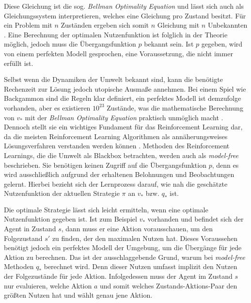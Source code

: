 Diese Gleichung ist die sog. \textit{Bellman Optimality Equation} und lässt sich auch als Gleichungssystem interpretieren, welches eine Gleichung pro Zustand besitzt. Für ein Problem mit $n$ Zuständen ergeben sich somit $n$ Gleichung mit $n$ Unbekannten \cite[S.~63]{Sutton1998}. Eine Berechnung der optimalen Nutzenfunktion ist folglich in der Theorie möglich, jedoch muss die Übergangsfunktion $p$ bekannt sein. Ist $p$ gegeben, wird von einem perfekten Modell gesprochen, eine Voraussetzung, die nicht immer erfüllt ist.
\par 
Selbst wenn die Dynamiken der Umwelt bekannt sind, kann die benötigte Rechenzeit zur Lösung jedoch utopische Ausmaße annehmen. Bei einem Spiel wie \glqq Backgammon\grqq{} sind die Regeln klar definiert, ein perfektes Modell ist demzufolge vorhanden, aber es existieren $10^{23}$ Zustände, was die mathematische Berechnung von $v_*$ mit der \textit{Bellman Optimality Equation} praktisch unmöglich macht \cite[S.~66]{Sutton1998}. Dennoch stellt sie ein wichtiges Fundament für das Reinforcement Learning dar, da die meisten Reinforcement Learning Algorithmen als annäherungsweises Lösungsverfahren verstanden werden können \cite[S.~66]{Sutton1998}. 
\newpage
Methoden des Reinforcement Learnings, die die Umwelt als Blackbox betrachten, werden auch als \textit{model-free} beschrieben. Sie benötigen keinen Zugriff auf die Übergangsfunktion $p$, denn es wird ausschließlich aufgrund der erhaltenen Belohnungen und Beobachtungen gelernt. Hierbei bezieht sich der Lernprozess darauf, wie nah die geschätzte Nutzenfunktion der aktuellen Strategie $\pi$ an $v_*$ bzw. $q_*$ ist.
\par 
Die optimale Strategie lässt sich leicht ermitteln, wenn eine optimale Nutzenfunktion gegeben ist. Ist zum Beispiel $v_*$ vorhanden und befindet sich der Agent in Zustand $s$, dann muss er eine Aktion vorausschauen, um den Folgezustand $s'$ zu finden, der den maximalen Nutzen hat. Dieses Voraussehen benötigt jedoch ein perfektes Modell der Umgebung, um die Übergänge für jede Aktion zu berechnen. Das ist der ausschlaggebende Grund, warum bei \textit{model-free} Methoden $q_*$ berechnet wird. Denn dieser Nutzen umfasst implizit den Nutzen der Folgezustände für jede Aktion. Infolgedessen muss der Agent im Zustand $s$ nur evaluieren, welche Aktion $a$ und somit welches Zustands-Aktions-Paar den größten Nutzen hat und wählt genau jene Aktion.
\par 

\par 